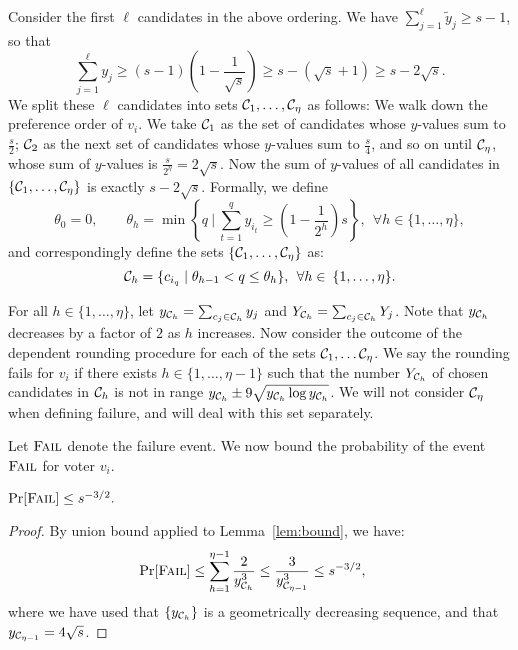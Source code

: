 Consider the first $\ell$ candidates in the above ordering. We have $\sum_{j=1}^{\ell} \tilde{y}_j \ge s - 1$, so that
\begin{equation}
    \label{eq:sumy}
\sum_{j=1}^{\ell} y_j \ge (s-1) \left(1 - \frac{1}{\sqrt{s}} \right) \ge s - (\sqrt{s}+1) \ge s - 2 \sqrt{s}.
\end{equation}
We split these $\ell$ candidates into sets $\mathcal{C}_1, \ldots, \mathcal{C}_{\eta}$ as follows: We walk down the preference order of $v_i$. We take $\mathcal{C}_1$ as the set of candidates whose $y$-values sum to $\frac{s}{2}$;  $\mathcal{C}_2$ as the next set of candidates whose  $y$-values sum to $\frac{s}{4}$, and so on until $\mathcal{C}_{\eta}$, whose sum of $y$-values is $\frac{s}{2^\eta} = 2\sqrt{s}$.  Now the sum of $y$-values of all candidates in $\{\mathcal{C}_1, \ldots, \mathcal{C}_{\eta}\}$ is exactly $s - 2\sqrt{s}$. Formally, we define 
\[
\theta_0 = 0, \qquad \theta_h = \min\left\{q \ \bigg| \ \sum_{t = 1}^q y_{i_t} \geq \left(1 - \frac{1}{2^h}\right)s \right\}, \:\:\forall h \in \{1, \ldots, \eta\},
\]
and correspondingly define the sets $\{\mathcal{C}_1, \ldots, \mathcal{C}_{\eta}\}$ as:
$$\mathcal{C}_h = \{c_{i_{q}} \mid \theta_{h - 1} < q \leq \theta_h\}, \:\: \forall h \in \:\{1, \ldots, \eta\}.$$

For all $h \in \{1, \ldots, \eta\}$, let $y_{\mathcal{C}_h} = \sum_{c_j \in \mathcal{C}_h}y_j$ and  $Y_{\mathcal{C}_h} = \sum_{c_j \in \mathcal{C}_h}Y_j$. Note that $y_{\mathcal{C}_h}$ decreases by a factor of $2$ as $h$ increases. Now consider the outcome of the dependent rounding procedure for each of the sets $\mathcal{C}_1, \ldots \mathcal{C}_{\eta}$. We say the rounding fails for $v_i$ if there exists $h \in \{1, \ldots, \eta-1\}$ such that the number $Y_{\mathcal{C}_h}$ of chosen candidates  in $\mathcal{C}_h$ is not in range $y_{\mathcal{C}_h} \pm 9 \sqrt{y_{\mathcal{C}_h}\log y_{\mathcal{C}_h}}$. We will not consider $\mathcal{C}_{\eta}$ when defining failure, and will deal with this set separately. 

Let ${\normalfont\textsc{Fail}}$ denote the failure event. We now bound the probability of the event ${\normalfont\textsc{Fail}}$ for voter $v_i$.
\begin{lemma}
$\Pr[{\normalfont\textsc{Fail}}] \leq s^{-3/2}.$
\end{lemma}
\begin{proof}
By union bound applied to Lemma~\ref{lem:bound}, we have:
\begin{align*}
\Pr[{\normalfont\textsc{Fail}}] & \leq \sum_{h = 1}^{\eta-1}\frac{2}{y_{\mathcal{C}_h}^3} \leq \frac{3}{y_{\mathcal{C}_{\eta-1}}^3} \le s^{-3/2},
\end{align*}
where we have used that $\{y_{\mathcal{C}_h}\}$ is a geometrically decreasing sequence, and that $y_{\mathcal{C}_{\eta-1}} = 4 \sqrt{s}$. 
\end{proof}

